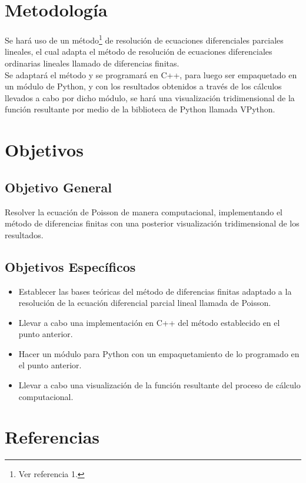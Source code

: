 \documentclass[letter]{article}
\begin{document}
\section{\normalsize Metodología}
Se hará uso de un método\footnote{Ver referencia 1.} de resolución de ecuaciones diferenciales parciales lineales, el cual adapta el método de resolución de ecuaciones diferenciales ordinarias lineales llamado de diferencias finitas.\\
Se adaptará el método y se programará en C++, para luego ser empaquetado en un módulo de Python, y con los resultados obtenidos a través de los cálculos llevados a cabo por dicho módulo, se hará una visualización tridimensional de la función resultante por medio de la biblioteca de Python llamada VPython.



\section{\normalsize Objetivos}

\subsection{\normalsize Objetivo General}
Resolver la ecuación de Poisson de manera computacional, implementando el método de diferencias finitas con una posterior visualización tridimensional de los resultados.

\subsection{\normalsize Objetivos Específicos}
\begin{itemize}
\item Establecer las bases teóricas del método de diferencias finitas adaptado a la resolución de la ecuación diferencial parcial lineal llamada de Poisson.
\item Llevar a cabo una implementación en C++ del método establecido en el punto anterior.
\item Hacer un módulo para Python con un empaquetamiento de lo programado en el punto anterior.
\item Llevar a cabo una visualización de la función resultante del proceso de cálculo computacional.
\end{itemize}



\section{\normalsize Referencias}
\end{document}
